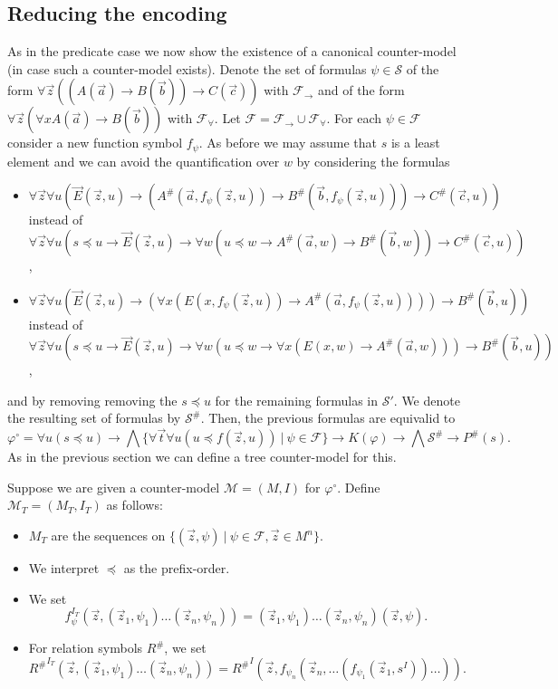 \documentclass[a4paper,UKenglish,cleveref, autoref, thm-restate]{lipics-v2021}
\begin{document}
\subsection{Reducing the encoding}

As in the predicate case we now show the existence of a canonical counter-model (in case such a counter-model exists). Denote the set of formulas $\psi\in\mathcal S$ of the form $\forall\vec z((A(\vec a)\to B(\vec b))\to C(\vec c))$ with $\mathcal F_\to$ and of the form $\forall \vec z(\forall xA(\vec a)\to B(\vec b))$ with $\mathcal F_\forall$. Let $\mathcal F = \mathcal F_\to\cup\mathcal F_\forall$. For each  $\psi\in\mathcal F$ consider a new function symbol $f_\psi$. As before we may assume that $s$ is a least element and we can avoid the quantification over $w$ by considering the formulas
\begin{itemize}
	\item $\forall \vec z\forall u(\vec E(\vec z, u)\to (A^\#(\vec a, f_\psi(\vec z, u))\to B^\#(\vec b, f_\psi(\vec z, u)))\to C^\#(\vec c, u))$\\instead of $\forall \vec z\forall u(s\preceq u\to\vec E(\vec z, u)\to \forall w(u\preceq w\to A^\#(\vec a, w)\to B^\#(\vec b, w))\to C^\#(\vec c, u))$,
	\item $\forall \vec z\forall u(\vec E(\vec z, u)\to (\forall x(E(x, f_\psi(\vec z, u))\to A^\#(\vec a, f_\psi(\vec z, u))))\to B^\#(\vec b, u))$\\instead of $\forall \vec z\forall u(s\preceq u\to\vec E(\vec z, u)\to \forall w(u\preceq w\to \forall x(E(x, w)\to A^\#(\vec a, w)))\to B^\#(\vec b, u))$,
\end{itemize}
and by removing removing the $s\preceq u$ for the remaining formulas in $\mathcal S'$.
We denote the resulting set of formulas by $\mathcal S^\#$.
Then, the previous formulas are equivalid to
$$\varphi^\circ= \forall u(s\preceq u)\to \bigwedge\{\forall \vec t\forall u(u\preceq f(\vec z, u))\:|\:\psi\in\mathcal F\}\to K(\varphi)\to\bigwedge\mathcal S^\#\to P^\#(s).$$
As in the previous section we can define a tree counter-model for this.

\begin{definition}
	Suppose we are given a counter-model $\mathcal M = (M, I)$ for $\varphi^\circ$. Define $\mathcal M_T = (M_T, I_T)$ as follows:
	\begin{itemize}
		\item $M_T$ are the sequences on $\{(\vec z, \psi)\:|\:\psi\in \mathcal F, \vec z\in M^n\}$.
		\item We interpret $\preceq$ as the prefix-order.
		\item We set $$f_\psi^{I_T}(\vec z, (\vec z_1, \psi_1)\dots (\vec z_n, \psi_n)) = (\vec z_1, \psi_1)\dots (\vec z_n, \psi_n)(\vec z, \psi).$$
		\item For relation symbols $R^\#$, we set $${R^\#}^{I_T}(\vec z, (\vec z_1, \psi_1)\dots (\vec z_n, \psi_n)) = {R^\#}^I(\vec z, f_{\psi_n}(\vec z_n, \dots(f_{\psi_1}(\vec z_1, s^I))\dots)).$$
	\end{itemize}
\end{definition}
\end{document}
